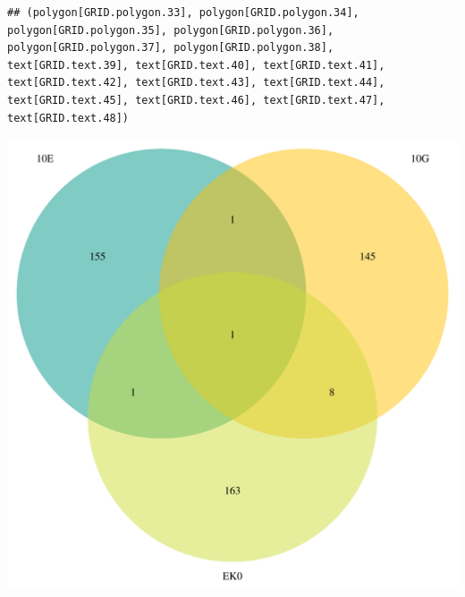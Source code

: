 \documentclass{article}\usepackage[]{graphicx}\usepackage[]{color}
\makeatletter
\newenvironment{kframe}{%
 \def\at@end@of@kframe{}%
 \ifinner\ifhmode%
  \def\at@end@of@kframe{\end{minipage}}%
  \begin{minipage}{\columnwidth}%
 \fi\fi%
 \def\FrameCommand##1{\hskip\@totalleftmargin \hskip-\fboxsep
 \colorbox{shadecolor}{##1}\hskip-\fboxsep
     \hskip-\linewidth \hskip-\@totalleftmargin \hskip\columnwidth}%
 \MakeFramed {\advance\hsize-\width
   \@totalleftmargin\z@ \linewidth\hsize
   \@setminipage}}%
 {\par\unskip\endMakeFramed%
 \at@end@of@kframe}
\newenvironment{knitrout}{}{} %
\makeatother
\begin{document}
\begin{knitrout}
\color{fgcolor}\begin{kframe}
\begin{verbatim}
## (polygon[GRID.polygon.33], polygon[GRID.polygon.34], polygon[GRID.polygon.35], polygon[GRID.polygon.36], polygon[GRID.polygon.37], polygon[GRID.polygon.38], text[GRID.text.39], text[GRID.text.40], text[GRID.text.41], text[GRID.text.42], text[GRID.text.43], text[GRID.text.44], text[GRID.text.45], text[GRID.text.46], text[GRID.text.47], text[GRID.text.48])
\end{verbatim}
\end{kframe}

{\centering \includegraphics[width=1\linewidth,height=.4\textheight]{figure/minimal-venn_t1_3fc_up_venn-1} 

}



\end{knitrout}
\end{document}
